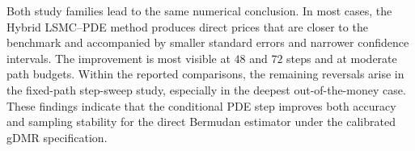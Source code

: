 

Both study families lead to the same numerical conclusion. In most cases, the Hybrid LSMC--PDE method produces direct prices that are closer to the benchmark and accompanied by smaller standard errors and narrower confidence intervals. The improvement is most visible at \(48\) and \(72\) steps and at moderate path budgets. Within the reported comparisons, the remaining reversals arise in the fixed-path step-sweep study, especially in the deepest out-of-the-money case. These findings indicate that the conditional PDE step improves both accuracy and sampling stability for the direct Bermudan estimator under the calibrated gDMR specification.
